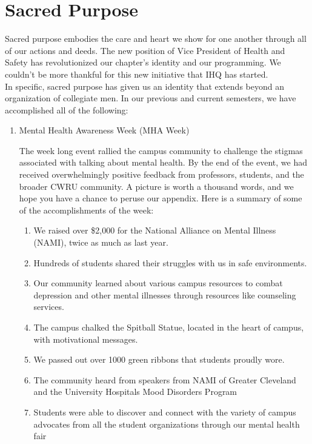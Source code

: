 \chapter{Sacred Purpose}

  Sacred purpose embodies the care and heart we show for one another through all of our actions and deeds. The new position of Vice President of Health and Safety has revolutionized our chapter's identity and our programming. We couldn't be more thankful for this new initiative that IHQ has started. \\

  In specific, sacred purpose has given us an identity that extends beyond an organization of collegiate men. In our previous and current semesters, we have accomplished all of the following:
  
  \begin{enumerate}
    \item Mental Health Awareness Week (MHA Week)
  	
  	The week long event rallied the campus community to challenge the stigmas associated with talking about mental health. By the end of the event, we had received overwhelmingly positive feedback from professors, students, and the broader CWRU community.  A picture is worth a thousand words, and we hope you have a chance to peruse our appendix. Here is a summary of some of the accomplishments of the week:
  	
  	\begin{enumerate}
	      \item We raised over \$2,000 for the National Alliance on Mental Illness (NAMI), twice as much as last year.  		
	      \item Hundreds of students shared their struggles with us in safe environments.  		
	      \item Our community learned about various campus resources to combat depression and other mental illnesses through resources like counseling services.	      
	      \item The campus chalked the Spitball Statue, located in the heart of campus, with motivational messages.
	      \item We passed out over 1000 green ribbons that students proudly wore.
	      \item The community heard from speakers from NAMI of Greater Cleveland and the University Hospitals Mood Disorders Program
	      \item Students were able to discover and connect with the variety of campus advocates from all the student organizations through our mental health fair
  	\end{enumerate}
  	

\end{enumerate}
